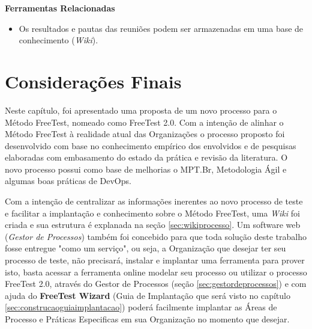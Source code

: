 \textbf{Ferramentas Relacionadas}
\begin{itemize}
    \item Os resultados e pautas das reuniões podem ser armazenadas em uma base de conhecimento (\textit{Wiki}).
\end{itemize}


\section{Considerações Finais}
\label{sec:consideracoesfinaiscap4}

Neste capítulo, foi apresentado uma proposta de um novo processo para o Método FreeTest, nomeado como FreeTest 2.0. Com a intenção de alinhar o Método FreeTest à realidade atual das Organizações o processo proposto foi desenvolvido com base no conhecimento empírico dos envolvidos e de pesquisas elaboradas com embasamento do estado da prática e revisão da literatura. O novo processo possui como base de melhorias o MPT.Br, Metodologia Ágil e algumas boas práticas de DevOps. 

Com a intenção de centralizar as informações inerentes ao novo processo de teste e facilitar a implantação e conhecimento sobre o Método FreeTest, uma \textit{Wiki} foi criada e sua estrutura é explanada na seção \ref{sec:wikiprocesso}. Um software web (\textit{Gestor de Processos}) também foi concebido para que toda solução deste trabalho fosse entregue "como um serviço", ou seja, a Organização que desejar ter seu processo de teste, não precisará, instalar e implantar uma ferramenta para prover isto, basta acessar a ferramenta online modelar seu processo ou utilizar o processo FreeTest 2.0, através do Gestor de Processos (seção \ref{sec:gestordeprocessos}) e com ajuda do \textbf{FreeTest Wizard} (Guia de Implantação que será visto no capítulo \ref{sec:construcaoguiaimplantacao}) poderá facilmente implantar as Áreas de Processo e Práticas Especificas em sua Organização no momento que desejar.